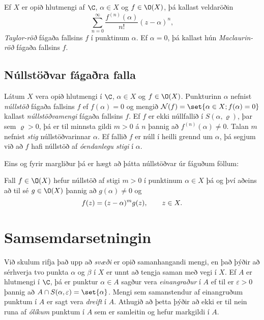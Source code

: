 \begin{sk}
Ef $X$ er opið hlutmengi af $\C$, $\alpha\in X$ og $f\in \O(X)$, þá
kallast veldaröðin
 \begin{equation*}\sum\limits_{n=0}^\infty \dfrac{f^{(n)}(\alpha)}{n!}(z-\alpha)^n,\label{10.4.5}
 \end{equation*}
{\it Taylor-röð} fágaða fallsins $f$ í punktinum $\alpha$.  Ef
$\alpha=0$, þá kallast hún {\it Maclaurin-röð}
fágaða fallsins $f$. 
\end{sk}


\subsection*{Núllstöðvar fágaðra falla}



\begin{sk}
Látum  $X$ vera opið hlutmengi í $\C$, $\alpha\in X$ og $f\in \O(X)$.
Punkturinn $\alpha$ nefnist {\it
núllstöð} fágaða
fallsins $f$ ef $f(\alpha)=0$ og mengið ${\cal N}(f)=\set{\alpha\in X;
f(\alpha)=0}$ kallast {\it núllstöðvamengi}
fágaða fallsins $f$. Ef $f$ er ekki núllfallið í
$S(\alpha,\varrho)$, þar sem $\varrho>0$, 
þá er til minnsta gildi $m>0$ á $n$ þannig að
$f^{(n)}(\alpha)\neq 0$.  
Talan $m$  nefnist {\it stig}
núllstöðvarinnar
$\alpha$.  Ef fallið $f$ er núll í heilli grennd um 
$\alpha$, þá segjum við að $f$ hafi núllstöð af {\it óendanlegu
stigi} í $\alpha$.
\end{sk}


Eins og fyrir margliður þá er hægt að þátta núllstöðvar úr fáguðum föllum:


\begin{se} \label{se:10.4.3}  Fall $f\in \O(X)$ hefur núllstöð af stigi $m>0$ í punktinum
$\alpha\in X$ þá og því aðeins að til sé $g\in \O(X)$ þannig að
$g(\alpha)\neq 0$ og
 \begin{equation*}f(z)=(z-\alpha)\sp mg(z), \qquad z\in X.
\label{10.4.6}
 \end{equation*}
\end{se}


\section{Samsemdarsetningin}

\noindent
Við skulum rifja það upp að {\it svæði} er opið
samanhangandi mengi, en það þýðir að sérhverja tvo punkta
$\alpha$ og $\beta$ í $X$ er unnt að tengja saman með vegi í $X$.  Ef
$A$ er hlutmengi í $\C$, þá er punktur $\alpha\in A$ sagður vera
{\it einangraður} í $A$ ef til er
$\varepsilon>0$ þannig að $A\cap S(\alpha,\varepsilon)=\set{\alpha}$.
Mengi sem samanstendur af einangruðum punktum í $A$ er sagt vera {\it
dreift} í $A$.   Athugið að þetta þýðir að ekki er til
nein runa af {\it ólíkum } punktum í $A$ sem er samleitin og hefur
markgildi í $A$.

